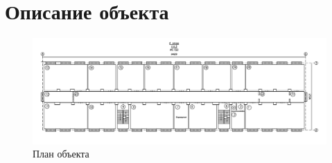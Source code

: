 \section{Описание объекта}

\begin{figure}[h]
    \begin{center}
        \includegraphics[width=180mm]{images/План объекта}
    \end{center}
    \captionsetup{justification=centering}
    \caption{План объекта}
    \label{fig::object_placement}
\end{figure}

